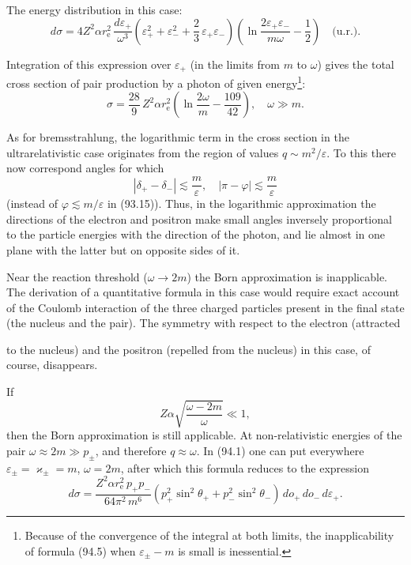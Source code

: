 The energy distribution in this case:
\begin{equation}
d\sigma = 4Z^2\alpha r_\mathrm{e}^2\,\frac{d\varepsilon_+}{\omega^3}\left(\varepsilon_+^2 + \varepsilon_-^2 + \frac{2}{3}\,\varepsilon_+\varepsilon_-\right)\!\left(\ln\frac{2\varepsilon_+\varepsilon_-}{m\omega} - \frac{1}{2}\right) \quad \text{(u.r.)}.
\label{eq:94.5}
\end{equation}

Integration of this expression over $\varepsilon_+$ (in the limits from $m$ to $\omega$) gives the total cross section of pair production by a photon of given energy\footnote{Because of the convergence of the integral at both limits, the inapplicability of formula (94.5) when $\varepsilon_\pm - m$ is small is inessential.}:
\begin{equation}
\sigma = \frac{28}{9}\,Z^2\alpha r_\mathrm{e}^2\!\left(\ln\frac{2\omega}{m} - \frac{109}{42}\right), \quad \omega \gg m.
\label{eq:94.6}
\end{equation}

As for bremsstrahlung, the logarithmic term in the cross section in the ultrarelativistic case originates from the region of values $q \sim m^2/\varepsilon$. To this there now correspond angles for which
\[
|\delta_+ - \delta_-| \lesssim \frac{m}{\varepsilon}, \quad |\pi - \varphi| \lesssim \frac{m}{\varepsilon}
\]
(instead of $\varphi \lesssim m/\varepsilon$ in (93.15)). Thus, in the logarithmic approximation the directions of the electron and positron make small angles inversely proportional to the particle energies with the direction of the photon, and lie almost in one plane with the latter but on opposite sides of it.

Near the reaction threshold ($\omega \to 2m$) the Born approximation is inapplicable. The derivation of a quantitative formula in this case would require exact account of the Coulomb interaction of the three charged particles present in the final state (the nucleus and the pair). The symmetry with respect to the electron (attracted


to the nucleus) and the positron (repelled from the nucleus) in this case, of course, disappears.

If
\begin{equation}
Z\alpha\sqrt{\frac{\omega - 2m}{\omega}} \ll 1,
\label{eq:94.7}
\end{equation}
then the Born approximation is still applicable. At non-relativistic energies of the pair $\omega \approx 2m \gg p_\pm$, and therefore $q \approx \omega$. In (94.1) one can put everywhere $\varepsilon_\pm = \varkappa_\pm = m$, $\omega = 2m$, after which this formula reduces to the expression
\begin{equation}
d\sigma = \frac{Z^2\alpha r_\mathrm{e}^2\,p_+p_-}{64\pi^2\,m^6}(p_+^2\sin^2\theta_+ + p_-^2\sin^2\theta_-)\,do_+\,do_-\,d\varepsilon_+.
\label{eq:94.8}
\end{equation}

